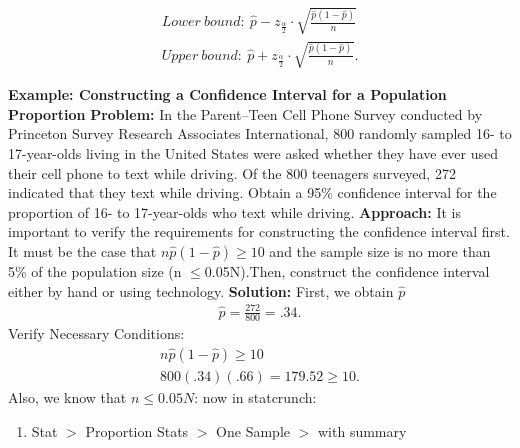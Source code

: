 \documentclass{report}
\begin{document}
      \begin{align*}
          Lower\ bound:\ \hat{p} - z_{\frac{\alpha}{2}} \cdot \sqrt{\frac{\hat{p}(1 - \hat{p})}{n}}  \\
          Upper\ bound:\ \hat{p} + z_{\frac{\alpha}{2}} \cdot \sqrt{\frac{\hat{p}(1 - \hat{p})}{n}}
      .\end{align*}
      \bigbreak \noindent 

      \pagebreak \bigbreak \noindent 
      \bigbreak \noindent 
      \begin{mdframed}
        \textbf{Example: Constructing a Confidence Interval for a Population Proportion}
        \bigbreak \noindent 
        \textbf{Problem:}
        In the Parent–Teen Cell Phone Survey conducted by Princeton Survey Research Associates International, 800 randomly sampled 16- to 17-year-olds living in the United States were asked whether they have ever used their cell phone to text while driving. Of the 800 teenagers surveyed, 272 indicated that they text while driving. Obtain a 95\% confidence interval for the proportion of 16- to 17-year-olds who text while driving.
        \bigbreak \noindent 
        \textbf{Approach:}
        It is important to verify the requirements for constructing the confidence interval first. It must be the case that $n\hat{p}(1 −\hat{p}) \geq 10$ and the sample size is no more than 5\% of the population size (n $ \leq $0.05N).Then, construct the confidence interval either by hand or using technology.
        \bigbreak \noindent 
        \textbf{Solution:}
        \bigbreak \noindent 
        First, we obtain $\hat{p} $
        \begin{align*}
            \hat{p} = \frac{272}{800} = .34
        .\end{align*}
        \bigbreak \noindent 
        Verify Necessary Conditions:
        \begin{align*}
           n\hat{p}(1-\hat{p})  \geq 10 \\
            800(.34)(.66) = 179.52 \geq 10
        .\end{align*}
        \bigbreak \noindent 
        Also, we know that $n \leq0.05N $:
        \bigbreak \noindent 
        now in statcrunch:
        \begin{enumerate}
            \item Stat $>$ Proportion Stats $> $ One Sample $> $ with summary

\end{enumerate}
\end{mdframed}
\end{document}
